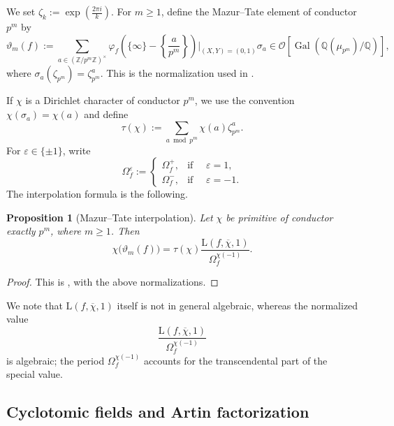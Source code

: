 \documentclass[11pt,table]{amsart}
\newtheorem{proposition}[theorem]{Proposition}
\newcommand{\Gal}{\op{Gal}}
\newcommand{\Z}{\mathbb{Z}}
\newcommand{\Q}{\mathbb{Q}}
\newcommand{\op}[1]{\operatorname{#1}}
\numberwithin{equation}{section}
\begin{document}
\par We set $\zeta_k:=\exp\left(\frac{2\pi i}{k}\right)$. For \(m\geq1\), define the Mazur--Tate element of conductor
\(p^m\) by
\begin{equation}
\label{eq:MT-element}
        \vartheta_m(f)
        :=
        \sum_{a\in(\Z/p^m\Z)^\times}
        \varphi_f
        \left(
        \{\infty\}
        -
        \left\{\frac{a}{p^m}\right\}
        \right)
        \Big|_{(X,Y)=(0,1)}
        \sigma_a
        \in
        \mathcal O
        \left[
        \Gal(\Q(\mu_{p^m})/\Q)
        \right],
\end{equation}
where $\sigma_a(\zeta_{p^m})=\zeta_{p^m}^a$. This is the normalization used in
\cite[\S2]{PollackWeston}.

\par If \(\chi\) is a Dirichlet character of conductor \(p^m\), we use
the convention $\chi(\sigma_a)=\chi(a)$ and define
\[
        \tau(\chi)
        :=
        \sum_{a\bmod p^m}
        \chi(a)\zeta_{p^m}^a.
\]
For \(\varepsilon\in\{\pm1\}\), write
\[
        \Omega_f^\varepsilon
        :=
        \begin{cases}
        \Omega_f^+,&\text{if }\quad\varepsilon=1,\\
        \Omega_f^-,&\text{if }\quad\varepsilon=-1.
        \end{cases}
\]
\noindent The interpolation formula is the following.

\begin{proposition}[Mazur--Tate interpolation]
\label{prop:MT-interpolation}
Let \(\chi\) be primitive of conductor exactly \(p^m\), where
\(m\geq1\).  Then
\begin{equation}
\label{interpolformula}
        \chi\bigl(\vartheta_m(f)\bigr)
        =
        \tau(\chi)
        \frac{\mathrm{L}(f,\overline\chi,1)}
             {\Omega_f^{\chi(-1)}}.
\end{equation}
\end{proposition}

\begin{proof}
This is \cite[Proposition~2.3]{PollackWeston}, with the above
normalizations.
\end{proof}
\par We note that \(\mathrm{L}(f,\overline\chi,1)\) itself is not in
general algebraic, whereas the normalized value
\[
        \frac{\mathrm{L}(f,\overline\chi,1)}
             {\Omega_f^{\chi(-1)}}
\]
is algebraic; the period \(\Omega_f^{\chi(-1)}\) accounts for the
transcendental part of the special value.
\subsection{Cyclotomic fields and Artin factorization}
\end{document}
